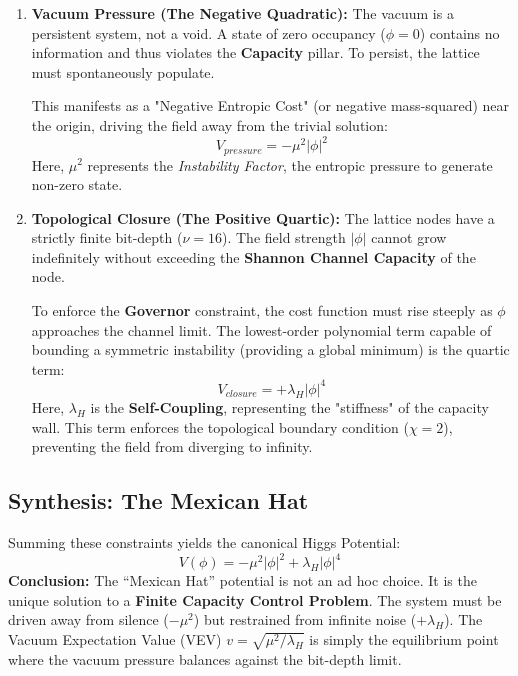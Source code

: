 \begin{enumerate}
    \item \textbf{Vacuum Pressure (The Negative Quadratic):}
    The vacuum is a persistent system, not a void. A state of zero occupancy ($\phi = 0$) contains no information and thus violates the \textbf{Capacity} pillar. To persist, the lattice must spontaneously populate.
    
    This manifests as a "Negative Entropic Cost" (or negative mass-squared) near the origin, driving the field away from the trivial solution:
    \begin{equation}
        V_{pressure} = -\mu^2 |\phi|^2
    \end{equation}
    Here, $\mu^2$ represents the \textit{Instability Factor}, the entropic pressure to generate non-zero state.

    \item \textbf{Topological Closure (The Positive Quartic):}
    The lattice nodes have a strictly finite bit-depth ($\nu=16$). The field strength $|\phi|$ cannot grow indefinitely without exceeding the \textbf{Shannon Channel Capacity} of the node.
    
    To enforce the \textbf{Governor} constraint, the cost function must rise steeply as $\phi$ approaches the channel limit. The lowest-order polynomial term capable of bounding a symmetric instability (providing a global minimum) is the quartic term:
    \begin{equation}
        V_{closure} = +\lambda_H |\phi|^4
    \end{equation}
    Here, $\lambda_H$ is the \textbf{Self-Coupling}, representing the "stiffness" of the capacity wall. This term enforces the topological boundary condition ($\chi=2$), preventing the field from diverging to infinity.
\end{enumerate}

\subsection{Synthesis: The Mexican Hat}
Summing these constraints yields the canonical Higgs Potential:
\begin{equation}
    V(\phi) = -\mu^2|\phi|^2 + \lambda_H|\phi|^4
\end{equation}
\textbf{Conclusion:} The ``Mexican Hat'' potential is not an ad hoc choice. It is the unique solution to a \textbf{Finite Capacity Control Problem}. The system must be driven away from silence ($-\mu^2$) but restrained from infinite noise ($+\lambda_H$). The Vacuum Expectation Value (VEV) $v = \sqrt{\mu^2/\lambda_H}$ is simply the equilibrium point where the vacuum pressure balances against the bit-depth limit.
